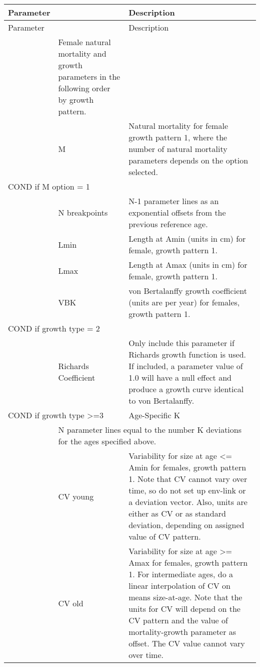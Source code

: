 \begin{longtable}{p{1cm} p{2.25cm} p{10cm}}
	\hline
	Parameter& & Description \Tstrut\Bstrut\\
	\hline
	\endfirsthead

	\hline
	Parameter& & Description \Tstrut\Bstrut\\
	\hline
	\endhead

	\hline
	\endfoot

	\endlastfoot

	\multicolumn{2}{l}{Females}\Tstrut & Female natural mortality and growth parameters in the following order by growth pattern. \\
	& M & Natural mortality for female growth pattern 1, where the number of natural mortality parameters depends on the option selected. \Bstrut\\
	\hline
	\multicolumn{2}{l}{COND if M option = 1} & \Tstrut\\
	& N breakpoints & N-1 parameter lines as an exponential offsets from the previous reference age. \Bstrut\\
	\hline

	& Lmin & Length at Amin (units in cm) for female, growth pattern 1. \\
	& Lmax & Length at Amax (units in cm) for female, growth pattern 1. \\
	& VBK & von Bertalanffy growth coefficient (units are per year) for females, growth pattern 1. \Bstrut\\
	\hline

	\multicolumn{2}{l}{COND if growth type = 2} & \Tstrut\\
	& Richards Coefficient & Only include this parameter if Richards growth function is used. If included, a parameter value of 1.0 will have a null effect and produce a growth curve identical to von Bertalanffy. \\

	\multicolumn{2}{l}{COND if growth type >=3} & Age-Specific K \\
	& \multicolumn{2}{l}{N parameter lines equal to the number K deviations for the ages specified above.} \Bstrut\\
	\hline

	\Tstrut & CV young & Variability for size at age <= Amin for females, growth pattern 1. Note that CV cannot vary over time, so do not set up env-link or a deviation vector. Also, units are either as CV or as standard deviation, depending on assigned value of CV pattern. \\
	& CV old & Variability for size at age >= Amax for females, growth pattern 1. For intermediate ages, do a linear interpolation of CV on means size-at-age. Note that the units for CV will depend on the CV pattern and the value of mortality-growth parameter as offset. The CV value cannot vary over time. \Bstrut\\
	\hline


\end{longtable}
